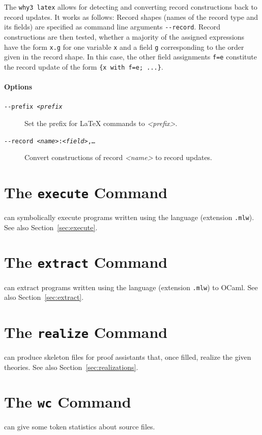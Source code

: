 The \texttt{why3 latex} allows for detecting and converting record
constructions back to record updates. It works as follows: Record shapes
(names of the record type and its fields) are specified as command line
arguments \texttt{-{}-record}. Record constructions are then tested,
whether a majority of the assigned expressions have the form
\texttt{x.g} for one variable \texttt{x} and a field \texttt{g}
corresponding to the order given in the record shape. In this case, the
other field assignments \texttt{f=e} constitute the record update of the
form \texttt{\{x with f=e; ...\}}.

\paragraph{Options}

\begin{description}
  \item[\texttt{-{}-prefix~\textsl{<prefix}}] Set the prefix for LaTeX
    commands to \textsl{<prefix>}.
  \item[\texttt{-{}-record~\textsl{<name>}:\textsl{<field>},\ldots}]
    Convert constructions of record \textsl{<name>} to record updates.
\end{description}

\section{The \texttt{execute} Command}
\label{sec:why3execute}

\why can symbolically execute programs written using the \whyml language
(extension \texttt{.mlw}). See also Section~\ref{sec:execute}.

\section{The \texttt{extract} Command}
\label{sec:why3extract}

\why can extract programs written using the \whyml language
(extension \texttt{.mlw}) to OCaml. See also Section~\ref{sec:extract}.

\section{The \texttt{realize} Command}
\label{sec:why3realize}

\why can produce skeleton files for proof assistants that, once filled,
realize the given theories. See also Section~\ref{sec:realizations}.

\section{The \texttt{wc} Command}
\label{sec:why3wc}

\why can give some token statistics about \whyml source files.

